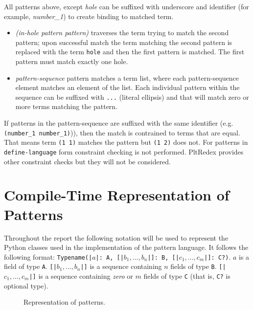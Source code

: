 All patterns above, except \textit{hole} can be suffixed with underscore and identifier (for example, \textit{number\_1}) to create binding to matched term.

\begin{itemize}
\item
\textit{(in-hole pattern pattern)} traverses the term trying to match the second pattern; upon successful match the term matching the second pattern is replaced with the term \texttt{hole} and then the first pattern is matched. The first pattern must match exactly one hole.

\item
\textit{pattern-sequence} pattern matches a term list, where each pattern-sequence element matches an element of the list. Each individual pattern within the sequence can be suffixed with \texttt{...} (literal ellipsis) and that will match zero or more terms matching the pattern.
\end{itemize}

If patterns in the pattern-sequence are suffixed with the same identifier (e.g. \texttt{(number\_1 number\_1)})), then the match is contrained to terms that are equal. That means term \texttt{(1 1)} matches the pattern but \texttt{(1 2)} does not. For patterns in \texttt{define-language} form constraint checking is not performed. PltRedex provides other constraint checks but they will not be considered.

\section{Compile-Time Representation of Patterns}

Throughout the report the following notation will be used to represent the Python classes used in the implementation of the pattern language. It follows the following format: \texttt{Typename(|$a$|: A, [|$b_1,...,b_n$|]: B, [|$c_1,...,c_m$|]: C?)}. $a$ is a field of type \texttt{A}. \texttt{[|$b_1,...,b_n$|]} is a sequence containing $n$ fields of type \texttt{B}. \texttt{[|$c_1,...,c_m$|]} is a sequence containing \textit{zero} or $m$ fields of type \texttt{C} (that is, \texttt{C?} is optional type).

\begin{figure}[H]
	\centering
	\caption{Representation of patterns.}
\label{class-diagram-pattern}
\end{figure}

